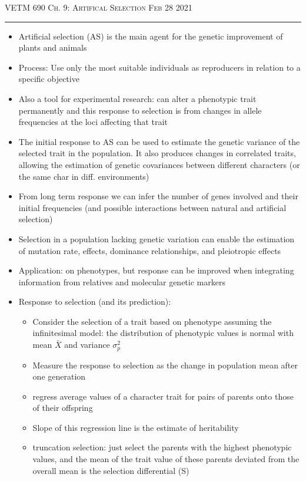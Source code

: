 \documentclass[12pt]{amsart}
\begin{document}
\thispagestyle{empty}

{\scshape VETM 690} \hfill {\scshape \Large  Ch. 9: Artifical Selection} \hfill {\scshape Feb 28 2021}
\medskip
\hrule
\bigskip

\begin{itemize}
\item Artificial selection (AS) is the main agent for the genetic improvement of plants and animals
\item Process: Use only the most suitable individuals as reproducers in relation to a specific objective
\item Also a tool for experimental research: can alter a phenotypic trait permanently and this response to selection is from changes in allele frequencies at the loci affecting that trait
\item The initial response to AS can be used to estimate the genetic variance of the selected trait in the population. It also produces changes in correlated traits, allowing the estimation of genetic covariances between different characters (or the same char in diff. environments)
\item From long term response we can infer the number of genes involved and their initial frequencies (and possible interactions between natural and artificial selection)
\item Selection in a population lacking genetic variation can enable the estimation of mutation rate, effects, dominance relationships, and pleiotropic effects 
\item Application: on phenotypes, but response can be improved when integrating information from relatives and molecular genetic markers
\item Response to selection (and its prediction):
\begin{itemize}
\item Consider the selection of a trait based on phenotype assuming the infinitesimal model: the distribution of phenotypic values is normal with mean $\bar{X}$ and variance $\sigma_p^2$ 
\item Measure the response to selection as the change in population mean after one generation
\item regress average values of a character trait for pairs of parents onto those of their offspring
\item Slope of this regression line is the estimate of heritability 
\item truncation selection: just select the parents with the highest phenotypic values, and the mean of the trait value of these parents deviated from the overall mean is the selection differential (S) 

\end{itemize}
\end{itemize}
\end{document}
